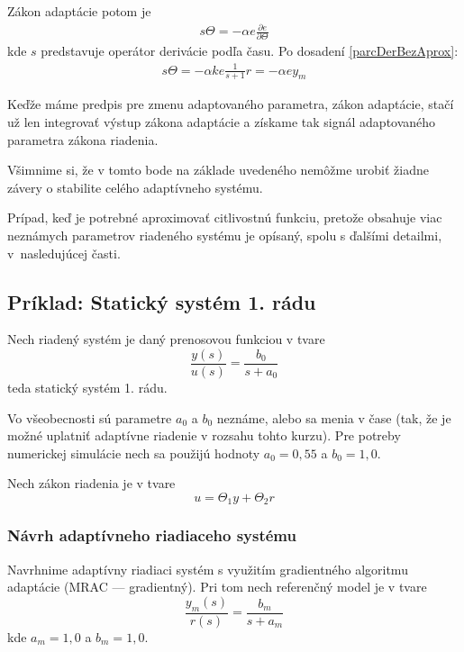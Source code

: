 \documentclass[a4paper, 10pt, ]{article}
\begin{document}
Zákon adaptácie potom je
\begin{align}
	 	s \Theta =  - \alpha e \frac{\partial e}{\partial \Theta}
\end{align}
kde $s$ predstavuje operátor derivácie podľa času. Po dosadení \eqref{parcDerBezAprox}:
\begin{align}
 	s \Theta =  - \alpha k e \frac{1}{s + 1} r = - \alpha  e y_m
\end{align}

Keďže máme predpis pre zmenu adaptovaného parametra, zákon adaptácie, stačí už len integrovať výstup zákona adaptácie a získame tak signál adaptovaného parametra zákona riadenia.

Všimnime si, že v tomto bode na základe uvedeného nemôžme urobiť žiadne závery o stabilite celého adaptívneho systému.

Prípad, keď je potrebné aproximovať citlivostnú funkciu, pretože obsahuje viac neznámych parametrov riadeného systému je opísaný, spolu s ďalšími detailmi, v~nasledujúcej časti.












\subsection{Príklad: Statický systém 1. rádu}

Nech riadený systém je daný prenosovou funkciou v tvare
\begin{equation}
    \frac{y(s)}{u(s)} = \frac{b_0}{s+a_0}
\end{equation}
teda statický systém 1. rádu.

Vo všeobecnosti sú parametre $a_0$ a $b_0$ neznáme, alebo sa menia v čase (tak, že je možné uplatniť adaptívne riadenie v rozsahu tohto kurzu). Pre potreby numerickej simulácie nech sa použijú hodnoty $a_0 = 0,55$ a $b_0 = 1,0$.

Nech zákon riadenia je v tvare
\begin{equation}
    u = \Theta_1 y + \Theta_2 r
\end{equation}


\subsubsection{Návrh adaptívneho riadiaceho systému}

Navrhnime adaptívny riadiaci systém s využitím gradientného algoritmu adaptácie (MRAC --- gradientný). Pri tom nech referenčný model je v tvare
\begin{equation} \label{prtfrm}
    \frac{y_m(s)}{r(s)} = \frac{b_m}{s + a_m}
\end{equation}
kde $a_m = 1,0$ a $b_m = 1,0$.
\end{document}
